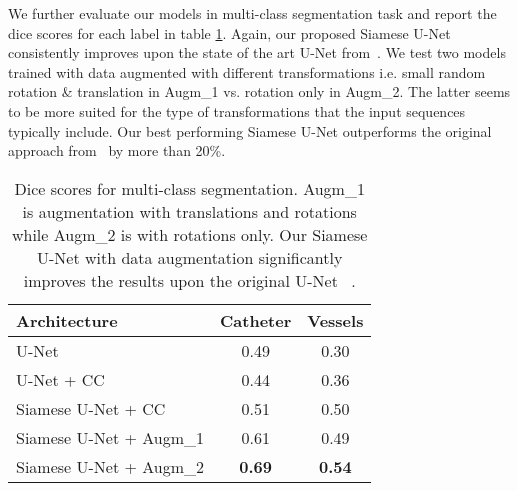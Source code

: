 \documentclass{bmvc2k}
\begin{document}
We further evaluate our models in multi-class segmentation task and report the dice scores for each label in table  \ref{Quant_results_2}. Again, our proposed Siamese U-Net consistently improves upon the state of the art U-Net from~\cite{unet}. We test two models trained with data augmented with different transformations i.e. small random rotation \& translation in Augm\_1 vs. rotation only in Augm\_2. The latter seems to be more suited for the type of transformations that the input sequences typically include. 
Our best performing Siamese U-Net outperforms the original approach from~\cite{unet} by more than 20\%.



\begin{table}[h]
\begin{tabular}{|l|c|c|}
	\hline
	\textbf{Architecture}  & \textbf{Catheter } & \textbf{Vessels}\\
	\hline\hline
	U-Net  & 0.49 & 0.30\\
	\hline
	U-Net + CC   & 0.44 & 0.36\\
	\hline
	Siamese  U-Net + CC   & 0.51 & 0.50\\
	\hline
	Siamese U-Net + Augm\_1  & 0.61 & 0.49\\
	\hline
	Siamese U-Net + Augm\_2  & {\bf 0.69} & {\bf 0.54}\\
	\hline
\end{tabular}
\caption{Dice scores for multi-class segmentation. Augm\_1 is augmentation with translations and rotations while Augm\_2 is with rotations only. Our Siamese U-Net with data augmentation significantly improves the results upon the original U-Net ~\cite{unet}.}
\label{Quant_results_2}
\end{table}
\end{document}
